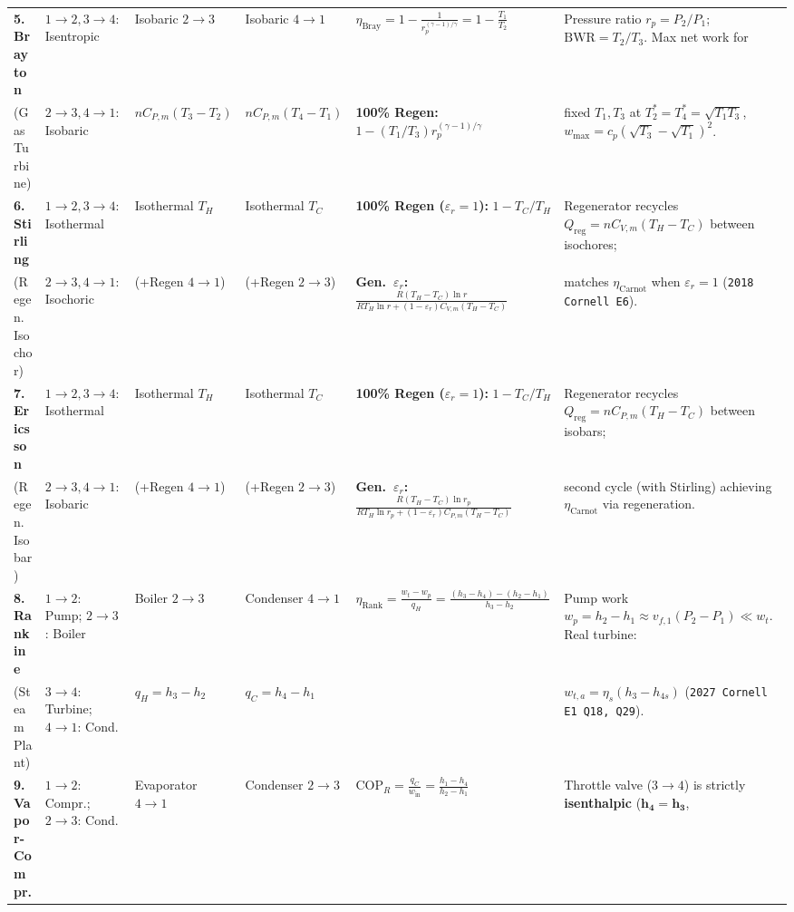 \documentclass[10pt,twoside,openany,letterpaper]{book}
\begin{document}
\begin{quicksheet}
\begin{formulacard}
\begin{tabularx}{\linewidth}{@{}l l l l l X@{}}
\textbf{5. Brayton} & $1\to 2, 3\to 4$: Isentropic & Isobaric $2\to 3$ & Isobaric $4\to 1$ & $\displaystyle \eta_{\mathrm{Bray}} = 1 - \frac{1}{r_p^{(\gamma - 1)/\gamma}} = 1 - \frac{T_1}{T_2}$ & Pressure ratio $r_p = P_2/P_1$; $\mathrm{BWR} = T_2/T_3$. Max net work for \\
(Gas Turbine) & $2\to 3, 4\to 1$: Isobaric & $nC_{P,m}(T_3 - T_2)$ & $nC_{P,m}(T_4 - T_1)$ & \textbf{100\% Regen:} $1 - (T_1/T_3)r_p^{(\gamma-1)/\gamma}$ & fixed $T_1, T_3$ at $T_2^* = T_4^* = \sqrt{T_1T_3}$, $w_{\max} = c_p(\sqrt{T_3}-\sqrt{T_1})^2$. \\[3pt]
\textbf{6. Stirling} & $1\to 2, 3\to 4$: Isothermal & Isothermal $T_H$ & Isothermal $T_C$ & \textbf{100\% Regen ($\varepsilon_r=1$):} $1 - T_C/T_H$ & Regenerator recycles $Q_{\mathrm{reg}} = nC_{V,m}(T_H - T_C)$ between isochores; \\
(Regen.\ Isochor) & $2\to 3, 4\to 1$: Isochoric & (+Regen $4\to 1$) & (+Regen $2\to 3$) & \textbf{Gen.\ $\varepsilon_r$:} $\frac{R(T_H-T_C)\ln r}{RT_H\ln r+(1-\varepsilon_r)C_{V,m}(T_H-T_C)}$ & matches $\eta_{\mathrm{Carnot}}$ when $\varepsilon_r = 1$ (\texttt{2018 Cornell E6}). \\[3pt]
\textbf{7. Ericsson} & $1\to 2, 3\to 4$: Isothermal & Isothermal $T_H$ & Isothermal $T_C$ & \textbf{100\% Regen ($\varepsilon_r=1$):} $1 - T_C/T_H$ & Regenerator recycles $Q_{\mathrm{reg}} = nC_{P,m}(T_H - T_C)$ between isobars; \\
(Regen.\ Isobar) & $2\to 3, 4\to 1$: Isobaric & (+Regen $4\to 1$) & (+Regen $2\to 3$) & \textbf{Gen.\ $\varepsilon_r$:} $\frac{R(T_H-T_C)\ln r_p}{RT_H\ln r_p+(1-\varepsilon_r)C_{P,m}(T_H-T_C)}$ & second cycle (with Stirling) achieving $\eta_{\mathrm{Carnot}}$ via regeneration. \\[3pt]
\textbf{8. Rankine} & $1\to 2$: Pump; $2\to 3$: Boiler & Boiler $2\to 3$ & Condenser $4\to 1$ & $\displaystyle \eta_{\mathrm{Rank}} = \frac{w_t - w_p}{q_H} = \frac{(h_3-h_4)-(h_2-h_1)}{h_3 - h_2}$ & Pump work $w_p = h_2-h_1 \approx v_{f,1}(P_2-P_1) \ll w_t$. Real turbine: \\
(Steam Plant) & $3\to 4$: Turbine; $4\to 1$: Cond. & $q_H = h_3 - h_2$ & $q_C = h_4 - h_1$ & & $w_{t,a} = \eta_s(h_3 - h_{4s})$ (\texttt{2027 Cornell E1 Q18, Q29}). \\[3pt]
\textbf{9. Vapor-Compr.} & $1\to 2$: Compr.; $2\to 3$: Cond. & Evaporator $4\to 1$ & Condenser $2\to 3$ & $\displaystyle \mathrm{COP}_R = \frac{q_C}{w_{\mathrm{in}}} = \frac{h_1 - h_4}{h_2 - h_1}$ & Throttle valve ($3\to 4$) is strictly \textbf{isenthalpic} ($\mathbf{h_4 = h_3}$, \\

\end{tabularx}
\end{formulacard}
\end{quicksheet}
\end{document}
